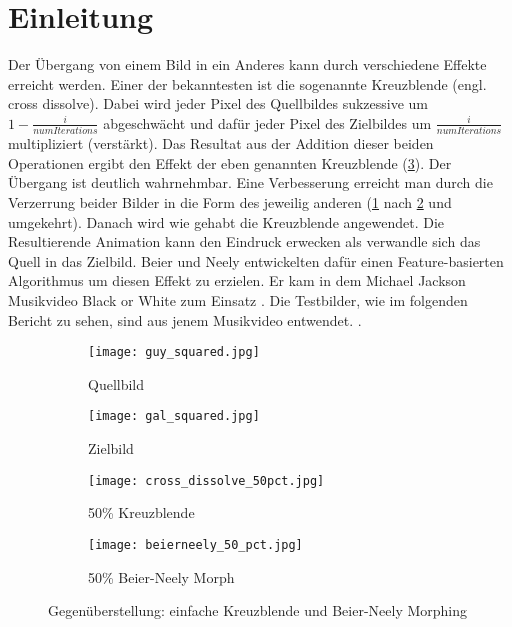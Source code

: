 \section*{Einleitung}

Der Übergang von einem Bild in ein Anderes kann durch verschiedene
Effekte erreicht werden. Einer der bekanntesten ist die sogenannte
Kreuzblende (engl. cross dissolve). Dabei wird jeder Pixel des Quellbildes
sukzessive um $1-\frac{i}{numIterations}$ abgeschwächt und dafür jeder Pixel
des Zielbildes um $\frac{i}{numIterations}$ multipliziert (verstärkt). 
Das Resultat aus der Addition dieser beiden Operationen ergibt den
Effekt der eben genannten Kreuzblende (\ref{fig:dissolve}). Der Übergang
ist deutlich wahrnehmbar. Eine Verbesserung erreicht man durch die Verzerrung
beider Bilder in die Form des jeweilig anderen (\ref{fig:source} nach \ref{fig:dest} und umgekehrt).
Danach wird wie gehabt die Kreuzblende angewendet.
Die Resultierende Animation
kann den Eindruck erwecken als verwandle sich das Quell in das Zielbild.
Beier und Neely \cite{beierneely} entwickelten dafür einen Feature-basierten 
Algorithmus um diesen Effekt zu erzielen. Er kam in dem Michael Jackson Musikvideo
Black or White zum Einsatz \cite{cartoonbrew}. Die Testbilder, wie im folgenden Bericht zu sehen, sind aus jenem Musikvideo entwendet. \cite{blackorwhite}.
\begin{figure}[!htb]
	
	\centering
	\begin{subfigure}{0.4\textwidth}
		\centering
		\texttt{[image: guy\_squared.jpg]}
		\caption{Quellbild}
		\label{fig:source}
	\end{subfigure}
	\hfill
	\begin{subfigure}{0.4\textwidth}
		\centering
		\texttt{[image: gal\_squared.jpg]}
		\caption{Zielbild}
		\label{fig:dest}
	\end{subfigure}
	
	\centering
	\begin{subfigure}{0.4\textwidth}
		\centering
		\texttt{[image: cross\_dissolve\_50pct.jpg]}
		\caption{50\% Kreuzblende}
		\label{fig:dissolve}
	\end{subfigure}
	\hfill
	\begin{subfigure}{0.4\textwidth}
		\centering
		\texttt{[image: beierneely\_50\_pct.jpg]}
		\caption{50\% Beier-Neely Morph}
		\label{fig:morph}
	\end{subfigure}
	\caption{Gegenüberstellung: einfache Kreuzblende und Beier-Neely Morphing}
	\label{fig:side-by-side}
	
\end{figure}
